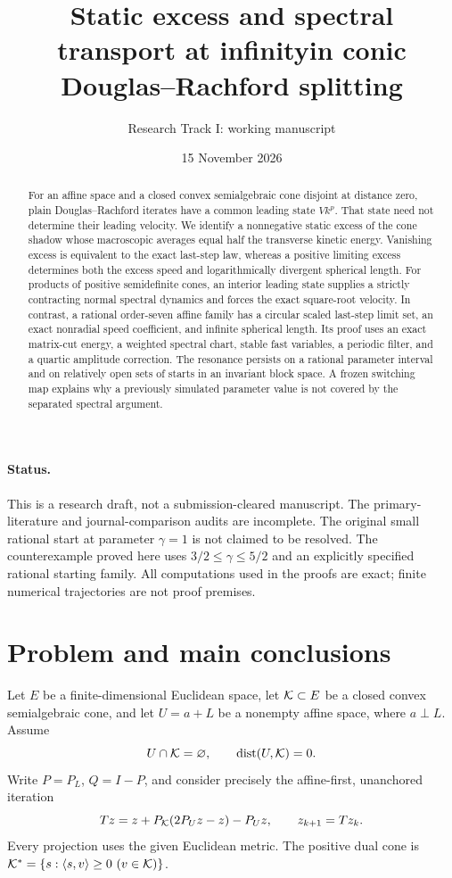 \documentclass[11pt]{article}
\title{Static excess and spectral transport at infinity\newline in conic Douglas--Rachford splitting}
\author{Research Track I: working manuscript}
\date{15 November 2026}
\theoremstyle{remark}\newtheorem{remark}[theorem]{Remark}
\newcommand{\ip}[2]{\langle #1,#2\rangle}\newcommand{\norm}[1]{\lVert #1\rVert}
\numberwithin{equation}{section}
\begin{document}
\maketitle
\begin{abstract}
For an affine space and a closed convex semialgebraic cone disjoint at distance zero, plain Douglas--Rachford iterates have a common leading state $Vk^p$. That state need not determine their leading velocity. We identify a nonnegative static excess of the cone shadow whose macroscopic averages equal half the transverse kinetic energy. Vanishing excess is equivalent to the exact last-step law, whereas a positive limiting excess determines both the excess speed and logarithmically divergent spherical length. For products of positive semidefinite cones, an interior leading state supplies a strictly contracting normal spectral dynamics and forces the exact square-root velocity. In contrast, a rational order-seven affine family has a circular scaled last-step limit set, an exact nonradial speed coefficient, and infinite spherical length. Its proof uses an exact matrix-cut energy, a weighted spectral chart, stable fast variables, a periodic filter, and a quartic amplitude correction. The resonance persists on a rational parameter interval and on relatively open sets of starts in an invariant block space. A frozen switching map explains why a previously simulated parameter value is not covered by the separated spectral argument.
\end{abstract}
\paragraph{Status.} This is a research draft, not a submission-cleared manuscript. The primary-literature and journal-comparison audits are incomplete. The original small rational start at parameter $\gamma=1$ is not claimed to be resolved. The counterexample proved here uses $3/2\leq\gamma\leq5/2$ and an explicitly specified rational starting family. All computations used in the proofs are exact; finite numerical trajectories are not proof premises.
\tableofcontents

\section{Problem and main conclusions}
Let $E$ be a finite-dimensional Euclidean space, let $\mathcal K\subset E$ be a closed convex semialgebraic cone, and let $U=a+L$ be a nonempty affine space, where $a\perp L$. Assume
\begin{equation}\label{eq:weak}
 U\cap\mathcal K=\varnothing,\qquad \operatorname{dist}(U,\mathcal K)=0.
\end{equation}
Write $P=P_L$, $Q=I-P$, and consider precisely the affine-first, unanchored iteration
\begin{equation}\label{eq:drs}
 Tz=z+P_\mathcal K(2P_Uz-z)-P_Uz,\qquad z_{k+1}=Tz_k.
\end{equation}
Every projection uses the given Euclidean metric. The positive dual cone is $\K^*=\{s:\ip{s}{v}\geq0\ (v\in\K)\}$.
\end{document}
